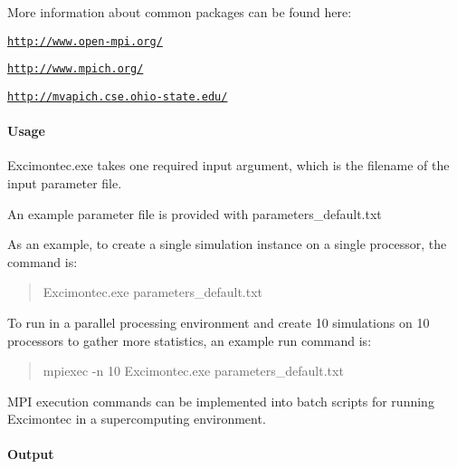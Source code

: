 More information about common packages can be found here\+:
\begin{DoxyItemize}
\item \href{http://www.open-mpi.org/}{\tt http\+://www.\+open-\/mpi.\+org/}
\item \href{http://www.mpich.org/}{\tt http\+://www.\+mpich.\+org/}
\item \href{http://mvapich.cse.ohio-state.edu/}{\tt http\+://mvapich.\+cse.\+ohio-\/state.\+edu/}
\end{DoxyItemize}

\paragraph*{Usage}

Excimontec.\+exe takes one required input argument, which is the filename of the input parameter file.

An example parameter file is provided with parameters\+\_\+default.\+txt

As an example, to create a single simulation instance on a single processor, the command is\+: \begin{quote}
Excimontec.\+exe parameters\+\_\+default.\+txt \end{quote}


To run in a parallel processing environment and create 10 simulations on 10 processors to gather more statistics, an example run command is\+: \begin{quote}
mpiexec -\/n 10 Excimontec.\+exe parameters\+\_\+default.\+txt \end{quote}


M\+PI execution commands can be implemented into batch scripts for running Excimontec in a supercomputing environment.

\paragraph*{Output}

